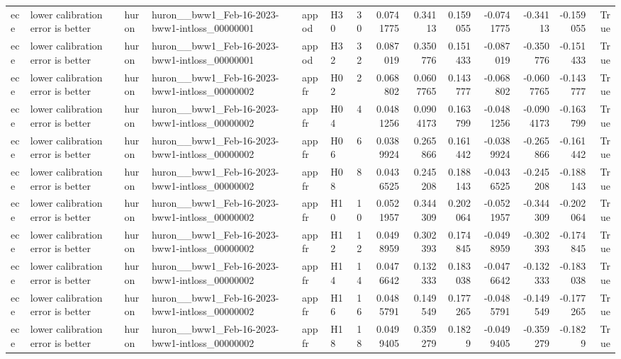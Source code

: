 \begin{longtable}{llllllrrrrrrrr}
ece & lower calibration error is better & huron & huron\_\_bww1\_Feb-16-2023-bww1-intloss\_00000001 & appod & H30 & 30 & 0.0741775 & 0.34113 & 0.159055 & -0.0741775 & -0.34113 & -0.159055 & True \\
ece & lower calibration error is better & huron & huron\_\_bww1\_Feb-16-2023-bww1-intloss\_00000001 & appod & H32 & 32 & 0.087019 & 0.350776 & 0.151433 & -0.087019 & -0.350776 & -0.151433 & True \\
ece & lower calibration error is better & huron & huron\_\_bww1\_Feb-16-2023-bww1-intloss\_00000002 & appfr & H02 & 2 & 0.068802 & 0.0607765 & 0.143777 & -0.068802 & -0.0607765 & -0.143777 & True \\
ece & lower calibration error is better & huron & huron\_\_bww1\_Feb-16-2023-bww1-intloss\_00000002 & appfr & H04 & 4 & 0.0481256 & 0.0904173 & 0.163799 & -0.0481256 & -0.0904173 & -0.163799 & True \\
ece & lower calibration error is better & huron & huron\_\_bww1\_Feb-16-2023-bww1-intloss\_00000002 & appfr & H06 & 6 & 0.0389924 & 0.265866 & 0.161442 & -0.0389924 & -0.265866 & -0.161442 & True \\
ece & lower calibration error is better & huron & huron\_\_bww1\_Feb-16-2023-bww1-intloss\_00000002 & appfr & H08 & 8 & 0.0436525 & 0.245208 & 0.188143 & -0.0436525 & -0.245208 & -0.188143 & True \\
ece & lower calibration error is better & huron & huron\_\_bww1\_Feb-16-2023-bww1-intloss\_00000002 & appfr & H10 & 10 & 0.0521957 & 0.344309 & 0.202064 & -0.0521957 & -0.344309 & -0.202064 & True \\
ece & lower calibration error is better & huron & huron\_\_bww1\_Feb-16-2023-bww1-intloss\_00000002 & appfr & H12 & 12 & 0.0498959 & 0.302393 & 0.174845 & -0.0498959 & -0.302393 & -0.174845 & True \\
ece & lower calibration error is better & huron & huron\_\_bww1\_Feb-16-2023-bww1-intloss\_00000002 & appfr & H14 & 14 & 0.0476642 & 0.132333 & 0.183038 & -0.0476642 & -0.132333 & -0.183038 & True \\
ece & lower calibration error is better & huron & huron\_\_bww1\_Feb-16-2023-bww1-intloss\_00000002 & appfr & H16 & 16 & 0.0485791 & 0.149549 & 0.177265 & -0.0485791 & -0.149549 & -0.177265 & True \\
ece & lower calibration error is better & huron & huron\_\_bww1\_Feb-16-2023-bww1-intloss\_00000002 & appfr & H18 & 18 & 0.0499405 & 0.359279 & 0.1829 & -0.0499405 & -0.359279 & -0.1829 & True \\

\end{longtable}
